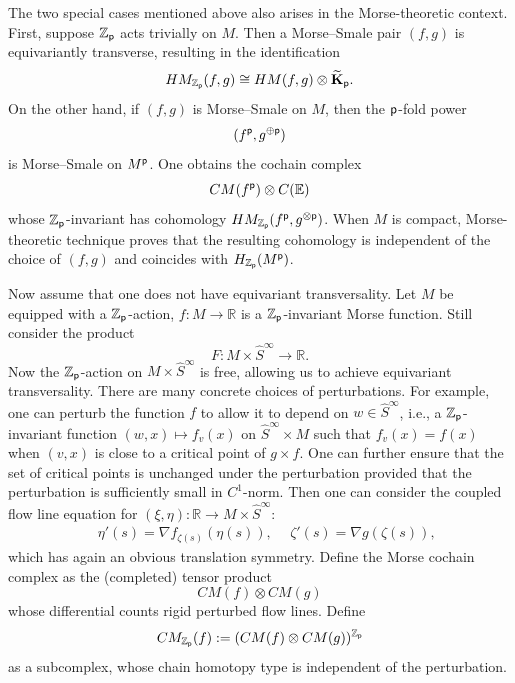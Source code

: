 \documentclass[reqno, 10pt]{amsart}
\numberwithin{equation}{section}
\numberwithin{equation}{section}
\theoremstyle{definition}
\theoremstyle{remark}
\newcommand{\beqn}{\begin{equation*}}
\newcommand{\eeqn}{\end{equation*}}
\newcommand{\mb}{\mathbb}
\newcommand{\p}{{\sf p}}
\newcommand{\tkp}{\wt{\bf K}_{\sf p}}
\newcommand{\zp}{{{\mb Z}_{\sf p}}}
\newcommand{\wt}{\widetilde}
\newcommand{\wh}{\widehat}
\begin{document}
The two special cases mentioned above also arises in the Morse-theoretic context. First, suppose $\zp$ acts trivially on $M$. Then a Morse--Smale pair $(f, g)$ is equivariantly transverse, resulting in the identification
\beqn
HM_{\zp} (f, g) \cong HM (f, g) \otimes \tkp.
\eeqn
On the other hand, if $(f, g)$ is Morse--Smale on $M$, then the $\p$-fold power
\beqn
(f^{\p}, g^{\oplus \p})
\eeqn
is Morse--Smale on $M^{\p}$. One obtains the cochain complex
\beqn
CM (f^\p) \otimes C({\mb E})
\eeqn
whose $\zp$-invariant has cohomology $HM_{\zp} (f^\p, g^{\otimes \p})$. When $M$ is compact, Morse-theoretic technique proves that the resulting cohomology is independent of the choice of $(f, g)$ and coincides with $H_{\zp} (M^\p)$.





Now assume that one does not have equivariant transversality. Let $M$ be equipped with a $\zp$-action, $f: M \to {\mb R}$ is a $\zp$-invariant Morse function. Still consider the product
\beqn
F: M \times \wh S^\infty \to {\mb R}.
\eeqn
Now the $\zp$-action on $M \times \wh S^\infty$ is free, allowing us to achieve equivariant transversality. There are many concrete choices of perturbations. For example, one can perturb the function $f$ to allow it to depend on $w \in \wh S^\infty$, i.e., a $\zp$-invariant function $(w, x) \mapsto f_v(x)$ on $\wh S^\infty \times M$ such that $f_v(x) = f(x)$ when $(v, x)$ is close to a critical point of $g \times f$. One can further ensure that the set of critical points is unchanged under the perturbation provided that the perturbation is sufficiently small in $C^1$-norm. Then one can consider the coupled flow line equation for $(\xi, \eta): {\mb R} \to M \times \wh S^\infty$:
\begin{align*}
    &\ \eta'(s) = \nabla f_{\zeta (s)} (\eta (s)),\ &\ \zeta'(s) = \nabla g(\zeta (s)),
\end{align*}
which has again an obvious translation symmetry. Define the Morse cochain complex as the (completed) tensor product
\beqn
CM (f) \otimes CM (g)
\eeqn
whose differential counts rigid perturbed flow lines. Define
\beqn
CM_{\zp}(f):= (CM (f) \otimes CM (g))^{\zp}
\eeqn
as a subcomplex, whose chain homotopy type is independent of the perturbation. 
\end{document}
